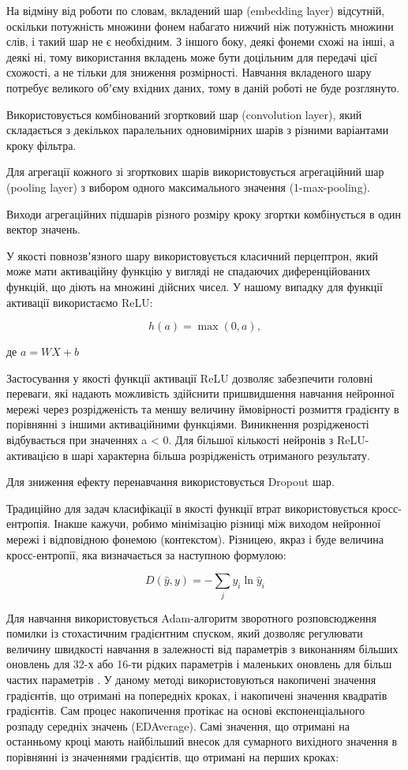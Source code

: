 На відміну від роботи по словам, вкладений шар (embedding layer) відсутній, оскільки потужність множини фонем набагато нижчий ніж потужність множини слів, і такий шар не є необхідним. З іншого боку, деякі фонеми схожі на інші, а деякі ні, тому використання вкладень може бути доцільним для передачі цієї схожості, а не тільки для зниження розмірності. Навчання вкладеного шару потребує великого обʼєму вхідних даних, тому в даній роботі не буде розглянуто.

Використовується комбінований згортковий шар (convolution layer), який складається з декількох паралельних одновимірних шарів з різними варіантами кроку фільтра.

Для агрегації кожного зі згорткових шарів використовується агрегаційний шар (pooling layer) з вибором одного максимального значення (1-max-pooling).

Виходи агрегаційних підшарів різного розміру кроку згортки комбінується в один вектор значень.

У якості повнозвʼязного шару використовується класичний перцептрон, який може мати активаційну функцію у вигляді не спадаючих диференційованих функцій, що діють на множині дійсних чисел. У нашому випадку для функції активації використаємо ReLU:

\[
h(a) = \max(0, a),
\]

\noindent
де $a=WX+b$

Застосування у якості функції активації ReLU дозволяє забезпечити головні переваги, які надають можливість здійснити пришвидшення навчання нейронної мережі через розрідженість та меншу величину ймовірності розмиття градієнту в порівнянні з іншими активаційними функціями. Виникнення розрідженості відбувається при значеннях a < 0. Для більшої кількості нейронів з ReLU-активацією в шарі характерна більша розрідженість отриманого результату.

Для зниження ефекту перенавчання використовується Dropout шар.

Традиційно для задач класифікації в якості функції втрат використовується кросс-ентропія. Інакше кажучи, робимо мінімізацію різниці між виходом нейронної мережі і відповідною фонемою (контекстом). Різницею, якраз і буде величина кросс-ентропії, яка визначається за наступною формулою:

\[
D(\hat{y},y)=-\sum_j y_i \ln \hat{y}_i
\]

Для навчання використовується Adam-алгоритм зворотного розповсюдження помилки із стохастичним градієнтним спуском, який дозволяє регулювати величину швидкості навчання в залежності від параметрів з виконанням більших оновлень для 32-х або 16-ти рідких параметрів і маленьких оновлень для більш частих параметрів \cite{Kingma_2014}. У даному методі використовуються накопичені значення градієнтів, що отримані на попередніх кроках, і накопичені значення квадратів градієнтів. Сам процес накопичення протікає на основі експоненціального розпаду середніх значень (EDAverage). Самі значення, що отримані на останньому кроці мають найбільший внесок для сумарного вихідного значення в порівнянні із значеннями градієнтів, що отримані на перших кроках:

